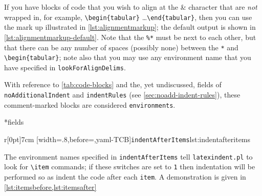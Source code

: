 	If you have blocks of code that you wish to align at the \&  character that
	are \emph{not} wrapped in, for example, \lstinline!\begin{tabular}! \ldots \lstinline!\end{tabular}!, then you can use the mark up
	illustrated in \cref{lst:alignmentmarkup}; the default output is shown in \cref{lst:alignmentmarkup-default}. Note that the \lstinline!%*! must be next to
	each other, but that there can be any number of spaces (possibly none) between the
	\lstinline!*! and \lstinline!\begin{tabular}!; note also that you may use any
	environment name that you have specified in \texttt{lookForAlignDelims}.

	\begin{minipage}{.45\textwidth}
	\end{minipage}%
	\hfill
	\begin{minipage}{.45\textwidth}
	\end{minipage}%

	With reference to \vref{tab:code-blocks} and the, yet undiscussed, fields of \texttt{noAdditionalIndent} and \texttt{indentRules}
	(see \vref{sec:noadd-indent-rules}), these comment-marked blocks are considered \texttt{environments}.

*{fields}
	\begin{wrapfigure}[5]{r}[0pt]{7cm}
		[width=.8\linewidth,before=\centering,yaml-TCB]{\texttt{indentAfterItems}}{lst:indentafteritems}
	\end{wrapfigure}
	The environment names specified in \texttt{indentAfterItems}  tell
	\texttt{latexindent.pl} to look for \lstinline!\item! commands; if these switches are set to \texttt{1}
	then indentation will be performed so as indent the code after each \texttt{item}.
	A demonstration is given in \cref{lst:itemsbefore,lst:itemsafter}

	\begin{minipage}{.45\textwidth}
	\end{minipage}%
	\hfill
	\begin{minipage}{.45\textwidth}
	\end{minipage}

